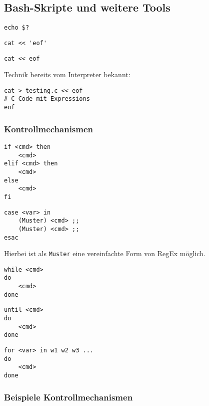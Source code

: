 	\subsection{Bash-Skripte und weitere Tools} %
	\label{sub:bash_skripte_und_weitere_tools}

		\begin{lstlisting}
echo $?
		\end{lstlisting}
		\begin{lstlisting}
cat << 'eof'
		\end{lstlisting}
		\begin{lstlisting}
cat << eof
		\end{lstlisting}
		Technik bereits vom Interpreter bekannt:
		\lstBash
		\begin{lstlisting}
cat > testing.c << eof
# C-Code mit Expressions
eof
		\end{lstlisting}

		\subsubsection*{Kontrollmechanismen} %
		\label{ssub:kontrollmechanismen}
		
			\begin{lstlisting}
if <cmd> then
	<cmd>
elif <cmd> then
	<cmd>
else
	<cmd>
fi
			\end{lstlisting}
			\begin{lstlisting}
case <var> in
	(Muster) <cmd> ;;
	(Muster) <cmd> ;;
esac
			\end{lstlisting}
			Hierbei ist als \texttt{Muster} eine vereinfachte Form von RegEx möglich.
			\begin{lstlisting}
while <cmd>
do
	<cmd>
done
			\end{lstlisting}
			\begin{lstlisting}
until <cmd>
do
	<cmd>
done
			\end{lstlisting}
			\begin{lstlisting}
for <var> in w1 w2 w3 ...
do
	<cmd>
done
			\end{lstlisting}

		\subsubsection*{Beispiele Kontrollmechanismen} %
		\label{ssub:beispiele_kontrollmechanismen}

